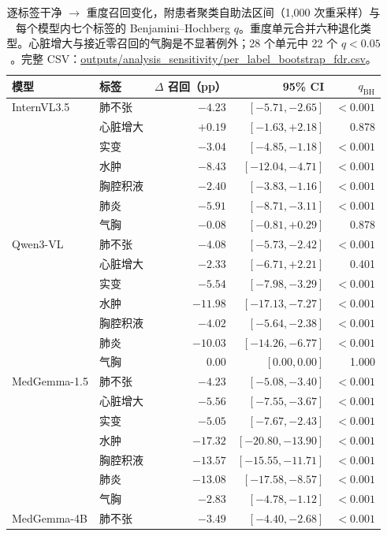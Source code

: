 \begin{table}[H]
\centering
\footnotesize
\setlength{\tabcolsep}{3pt}
\caption{逐标签干净 $\rightarrow$ 重度召回变化，附患者聚类自助法区间（1,000 次重采样）与每个模型内七个标签的 Benjamini--Hochberg $q$。重度单元合并六种退化类型。心脏增大与接近零召回的气胸是不显著例外；28 个单元中 22 个 $q<0.05$。完整 CSV：\url{outputs/analysis_sensitivity/per_label_bootstrap_fdr.csv}。}
\label{tab:perlabel}
\begin{tabular}{llrrr}
\toprule
模型 & 标签 & $\Delta$ 召回（pp） & 95\% CI & $q_{\mathrm{BH}}$ \\
\midrule
InternVL3.5 & 肺不张 & $-4.23$ & $[-5.71,-2.65]$ & $<0.001$ \\
 & 心脏增大 & $+0.19$ & $[-1.63,+2.18]$ & 0.878 \\
 & 实变 & $-3.04$ & $[-4.85,-1.18]$ & $<0.001$ \\
 & 水肿 & $-8.43$ & $[-12.04,-4.71]$ & $<0.001$ \\
 & 胸腔积液 & $-2.40$ & $[-3.83,-1.16]$ & $<0.001$ \\
 & 肺炎 & $-5.91$ & $[-8.71,-3.11]$ & $<0.001$ \\
 & 气胸 & $-0.08$ & $[-0.81,+0.29]$ & 0.878 \\
\midrule
Qwen3-VL & 肺不张 & $-4.08$ & $[-5.73,-2.42]$ & $<0.001$ \\
 & 心脏增大 & $-2.33$ & $[-6.71,+2.21]$ & 0.401 \\
 & 实变 & $-5.54$ & $[-7.98,-3.29]$ & $<0.001$ \\
 & 水肿 & $-11.98$ & $[-17.13,-7.27]$ & $<0.001$ \\
 & 胸腔积液 & $-4.02$ & $[-5.64,-2.38]$ & $<0.001$ \\
 & 肺炎 & $-10.03$ & $[-14.26,-6.77]$ & $<0.001$ \\
 & 气胸 & $0.00$ & $[0.00,0.00]$ & 1.000 \\
\midrule
MedGemma-1.5 & 肺不张 & $-4.23$ & $[-5.08,-3.40]$ & $<0.001$ \\
 & 心脏增大 & $-5.56$ & $[-7.55,-3.67]$ & $<0.001$ \\
 & 实变 & $-5.05$ & $[-7.67,-2.43]$ & $<0.001$ \\
 & 水肿 & $-17.32$ & $[-20.80,-13.90]$ & $<0.001$ \\
 & 胸腔积液 & $-13.57$ & $[-15.55,-11.71]$ & $<0.001$ \\
 & 肺炎 & $-13.08$ & $[-17.58,-8.57]$ & $<0.001$ \\
 & 气胸 & $-2.83$ & $[-4.78,-1.12]$ & $<0.001$ \\
\midrule
MedGemma-4B & 肺不张 & $-3.49$ & $[-4.40,-2.68]$ & $<0.001$ \\

\end{tabular}
\end{table}
